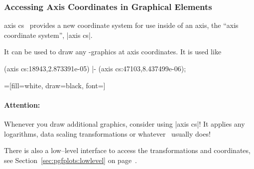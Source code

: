 \subsubsection{Accessing Axis Coordinates in Graphical Elements}
\label{sec:axis:coords}%
\begin{coordinatesystem}{axis cs}
\PGFPlots\ provides a new coordinate system for use inside of an axis, the ``axis coordinate system'', |axis cs|.

It can be used to draw any \Tikz-graphics at axis coordinates. It is used like
\begin{codeexample}
\draw 
   (axis cs:18943,2.873391e-05) 
|- (axis cs:47103,8.437499e-06);
\end{codeexample}
\begin{codeexample}[]
=[fill=white,
	draw=black,
	font=\footnotesize]
\end{codeexample}

\begin{codeexample}[]
\end{codeexample}

\paragraph{Attention:} Whenever you draw additional graphics, consider using |axis cs|! It applies any logarithms, data scaling transformations or whatever \PGFPlots\ usually does!

There is also a low--level interface to access the transformations and coordinates, see Section~\ref{sec:pgfplots:lowlevel} on page~\pageref{sec:pgfplots:lowlevel}.
\end{coordinatesystem}


